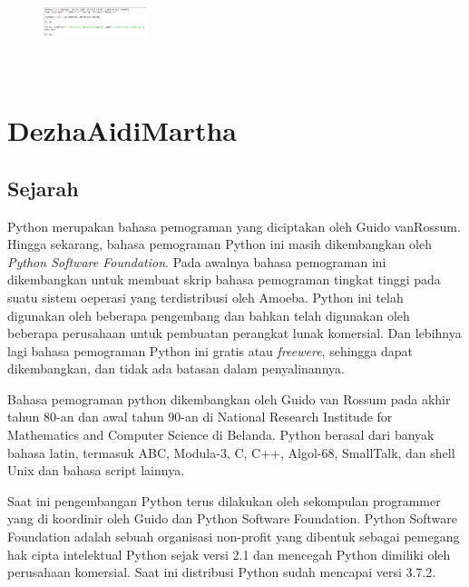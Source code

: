      \begin{figure}[H]
        \centering
        \includegraphics[width=3cm,height=3cm]{figures/oni/11.png}
        \label{akhir}
        \end{figure}



\section{DezhaAidiMartha}

\subsection{Sejarah}
Python merupakan bahasa pemograman yang diciptakan oleh Guido vanRossum. Hingga sekarang, bahasa pemograman Python ini masih dikembangkan oleh \textit{Python Software Foundation}. Pada awalnya bahasa pemograman ini dikembangkan untuk membuat skrip bahasa pemograman tingkat tinggi pada suatu sistem oeperasi yang terdistribusi oleh Amoeba. Python ini telah digunakan oleh beberapa pengembang dan bahkan telah digunakan oleh beberapa perusahaan untuk pembuatan perangkat lunak komersial. Dan lebihnya lagi bahasa pemograman Python ini gratis atau \textit{freewere}, sehingga dapat dikembangkan, dan tidak ada batasan dalam penyalinannya.

Bahasa pemograman python dikembangkan oleh Guido van Rossum pada akhir tahun 80-an dan awal tahun 90-an di National Research Institude for Mathematics and Computer Science di Belanda. Python berasal dari banyak bahasa latin, termasuk ABC, Modula-3, C, C++, Algol-68, SmallTalk, dan shell Unix dan bahasa script lainnya.

Saat ini pengembangan Python terus dilakukan oleh sekompulan programmer yang di koordinir oleh Guido dan Python Software Foundation. Python Software Foundation adalah sebuah organisasi non-profit yang dibentuk sebagai pemegang hak cipta intelektual Python sejak versi 2.1 dan mencegah Python dimiliki oleh perusahaan komersial. Saat ini distribusi Python sudah mencapai versi 3.7.2.

